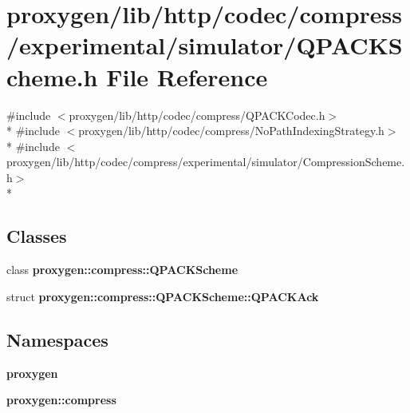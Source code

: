 \section{proxygen/lib/http/codec/compress/experimental/simulator/\+Q\+P\+A\+C\+K\+Scheme.h File Reference}
\label{QPACKScheme_8h}
{\ttfamily \#include $<$proxygen/lib/http/codec/compress/\+Q\+P\+A\+C\+K\+Codec.\+h$>$}\\*
{\ttfamily \#include $<$proxygen/lib/http/codec/compress/\+No\+Path\+Indexing\+Strategy.\+h$>$}\\*
{\ttfamily \#include $<$proxygen/lib/http/codec/compress/experimental/simulator/\+Compression\+Scheme.\+h$>$}\\*
\subsection*{Classes}
\begin{DoxyCompactItemize}
\item 
class {\bf proxygen\+::compress\+::\+Q\+P\+A\+C\+K\+Scheme}
\item 
struct {\bf proxygen\+::compress\+::\+Q\+P\+A\+C\+K\+Scheme\+::\+Q\+P\+A\+C\+K\+Ack}
\end{DoxyCompactItemize}
\subsection*{Namespaces}
\begin{DoxyCompactItemize}
\item 
 {\bf proxygen}
\item 
 {\bf proxygen\+::compress}
\end{DoxyCompactItemize}
